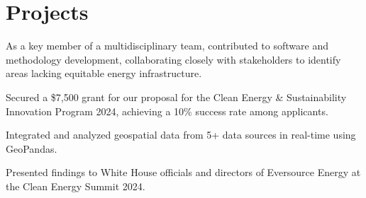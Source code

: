 \documentclass[]{resume-template}
\begin{document}
\begin{minipage}[t]{0.66\textwidth}
  \section{Projects}\label{sec:projects}
  \label{subsec:exo-eda}
  \begin{tightemize}
  \item As a key member of a multidisciplinary team, contributed to
    software and methodology development, collaborating closely with
    stakeholders to identify areas lacking equitable energy infrastructure.
  \item Secured a \$7,500 grant for our proposal for the Clean Energy
    \& Sustainability Innovation Program 2024, achieving a 10\%
    success rate among applicants.
  \item Integrated and analyzed geospatial data from 5+ data sources
    in real-time using GeoPandas.
  \item Presented findings to White House officials and directors of
    Eversource Energy at the Clean Energy Summit 2024.
  \end{tightemize}

\end{minipage}
\end{document}
